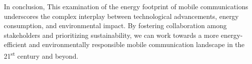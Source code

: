 \documentclass[11pt,a4paper]{article}
\begin{document}
In conclusion, This examination of the energy footprint of mobile communications underscores the complex interplay between technological advancements, energy consumption, and environmental impact.
By fostering collaboration among stakeholders and prioritizing sustainability, we can work towards a more energy-efficient and environmentally responsible mobile communication landscape in the 21\textsuperscript{st} century and beyond.

\appendix
\glsaddall
\printnoidxglossary[type=\acronymtype,nonumberlist,style=long]

\renewcommand*{\refname}{\section{References}}
{}
\end{document}
